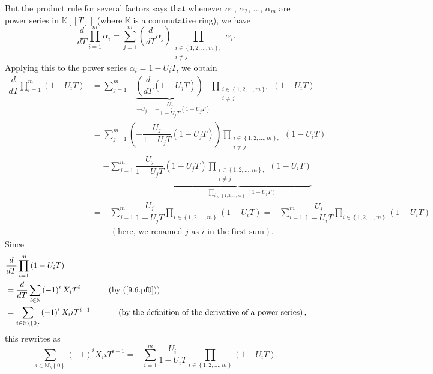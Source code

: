 \documentclass[numbers=enddot,12pt,final,onecolumn,notitlepage]{scrartcl}%
\begin{document}
But the product rule for several factors says that whenever $\alpha_{1}$,
$\alpha_{2}$, $...$, $\alpha_{m}$ are power series in $\mathbb{K}\left[
\left[  T\right]  \right]  $ (where $\mathbb{K}$ is a commutative ring), we
have%
\[
\dfrac{d}{dT}\prod\limits_{i=1}^{m}\alpha_{i}=\sum_{j=1}^{m}\left(  \dfrac
{d}{dT}\alpha_{j}\right)  \prod_{\substack{i\in\left\{  1,2,...,m\right\}
;\\i\neq j}}\alpha_{i}.
\]
Applying this to the power series $\alpha_{i}=1-U_{i}T$, we obtain%
\begin{align*}
\dfrac{d}{dT}\prod\limits_{i=1}^{m}\left(  1-U_{i}T\right)   &  =\sum
_{j=1}^{m}\underbrace{\left(  \dfrac{d}{dT}\left(  1-U_{j}T\right)  \right)
}_{=-U_{j}=-\dfrac{U_{j}}{1-U_{j}T}\left(  1-U_{j}T\right)  }\prod
_{\substack{i\in\left\{  1,2,...,m\right\}  ;\\i\neq j}}\left(  1-U_{i}%
T\right) \\
&  =\sum_{j=1}^{m}\left(  -\dfrac{U_{j}}{1-U_{j}T}\left(  1-U_{j}T\right)
\right)  \prod_{\substack{i\in\left\{  1,2,...,m\right\}  ;\\i\neq j}}\left(
1-U_{i}T\right) \\
&  =-\sum_{j=1}^{m}\dfrac{U_{j}}{1-U_{j}T}\underbrace{\left(  1-U_{j}T\right)
\prod_{\substack{i\in\left\{  1,2,...,m\right\}  ;\\i\neq j}}\left(
1-U_{i}T\right)  }_{=\prod\limits_{i\in\left\{  1,2,...,m\right\}  }\left(
1-U_{i}T\right)  }\\
&  =-\sum_{j=1}^{m}\dfrac{U_{j}}{1-U_{j}T}\prod\limits_{i\in\left\{
1,2,...,m\right\}  }\left(  1-U_{i}T\right)  =-\sum\limits_{i=1}^{m}%
\dfrac{U_{i}}{1-U_{i}T}\prod\limits_{i\in\left\{  1,2,...,m\right\}  }\left(
1-U_{i}T\right) \\
&  \ \ \ \ \ \ \ \ \ \ \left(  \text{here, we renamed }j\text{ as }i\text{ in
the first sum}\right)  .
\end{align*}
Since%
\begin{align*}
&  \dfrac{d}{dT}\prod\limits_{i=1}^{m}\left(  1-U_{i}T\right) \\
&  =\dfrac{d}{dT}\sum_{i\in\mathbb{N}}\left(  -1\right)  ^{i}X_{i}%
T^{i}\ \ \ \ \ \ \ \ \ \ \left(  \text{by (\ref{9.6.pf0})}\right) \\
&  =\sum_{i\in\mathbb{N}\setminus\left\{  0\right\}  }\left(  -1\right)
^{i}X_{i}iT^{i-1}\ \ \ \ \ \ \ \ \ \ \left(  \text{by the definition of the
derivative of a power series}\right)  ,
\end{align*}
this rewrites as%
\begin{equation}
\sum_{i\in\mathbb{N}\setminus\left\{  0\right\}  }\left(  -1\right)  ^{i}%
X_{i}iT^{i-1}=-\sum\limits_{i=1}^{m}\dfrac{U_{i}}{1-U_{i}T}\prod
\limits_{i\in\left\{  1,2,...,m\right\}  }\left(  1-U_{i}T\right)  .
\label{9.6.pf2}%
\end{equation}
\end{document}
